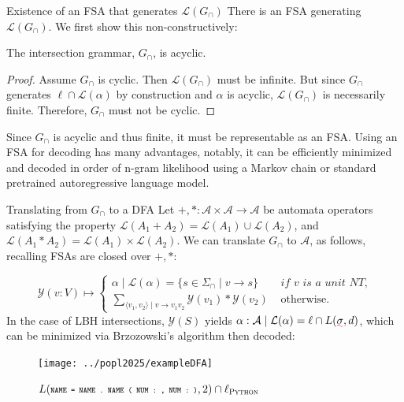 \documentclass{beamer}
\begin{document}
\begin{frame}[fragile]{Existence of an FSA that generates $\mathcal{L}(G_\cap)$}
There is an FSA generating $\mathcal{L}(G_\cap)$. We first show this non-constructively:

\begin{lemma}\label{lemma:upper-bound}
The intersection grammar, $G_\cap$, is acyclic.
\end{lemma}

\begin{proof}
Assume $G_\cap$ is cyclic. Then $\mathcal{L}(G_\cap)$ must be infinite. But since $G_\cap$ generates $\ell \cap \mathcal{L}(\alpha)$ by construction and $\alpha$ is acyclic, $\mathcal{L}(G_\cap)$ is necessarily finite. Therefore, $G_\cap$ must not be cyclic.
\end{proof}

Since $G_\cap$ is acyclic and thus finite, it must be representable as an FSA. Using an FSA for decoding has many advantages, notably, it can be efficiently minimized and decoded in order of n-gram likelihood using a Markov chain or standard pretrained autoregressive language model.
\end{frame}

\begin{frame}[fragile]{Translating from $G_\cap$ to a DFA}
Let $+, *: \mathcal{A}\times \mathcal{A} \rightarrow \mathcal{A}$ be automata operators satisfying the property $\mathcal{L}(A_1 + A_2) = \mathcal{L}(A_1)\cup\mathcal{L}(A_2)$, and $\mathcal{L}(A_1 * A_2) = \mathcal{L}(A_1)\times\mathcal{L}(A_2)$. We can translate $G_\cap$ to $\mathcal{A}$, as follows, recalling FSAs are closed over $+, *$:

\begin{equation*}
\mathcal{Y}(v: V) \mapsto \begin{cases}
\alpha \mid \mathcal{L}(\alpha) = \{s \in \Sigma_\cap \mid v \rightarrow s\} & \textit{ if v is a unit NT}, \\
\sum_{\langle v_1, v_2\rangle \mid v \rightarrow v_1 v_2} \mathcal{Y}(v_1)*\mathcal{Y}(v_2) & \text{ otherwise.}
\end{cases}
\end{equation*}
%
In the case of LBH intersections, $\mathcal{Y}(S)$ yields $\alpha: \mathcal{A} \mid \mathcal{L}(\alpha) = \ell\cap L(\err\sigma, d)$, which can be minimized via Brzozowski's algorithm then decoded:

\begin{figure}[H]
\centering
\texttt{[image: ../popl2025/exampleDFA]}
\caption{$L(\scriptsize{\texttt{NAME = NAME . NAME ( NUM : , NUM : )}}, 2) \cap \ell_\textsc{Python}$}
\end{figure}
\end{frame}
\end{document}
